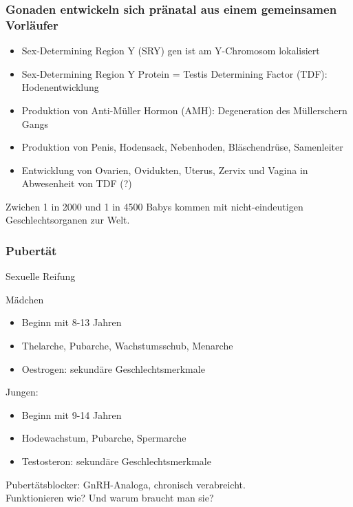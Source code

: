 \documentclass{beamer}
\begin{document}
\begin{frame}
\frametitle{Gonaden entwickeln sich pränatal aus einem gemeinsamen Vorläufer}


\begin{itemize}
    \item 
 Sex-Determining Region Y (SRY) gen ist am Y-Chromosom lokalisiert
   \pause
 \item
 Sex-Determining Region Y Protein = Testis Determining Factor (TDF): Hodenentwicklung
 \pause
 \item
Produktion von Anti-Müller Hormon (AMH): Degeneration des Müllerschern Gangs
\pause
 \item
Produktion  von Penis, Hodensack, Nebenhoden, Bläschendrüse, Samenleiter
\pause
 \item
Entwicklung von Ovarien, Ovidukten, Uterus, Zervix und Vagina in Abwesenheit von TDF (?)

\end{itemize}

\pause
Zwichen 1 in 2000 und 1 in 4500 Babys kommen mit nicht-eindeutigen Geschlechtsorganen zur Welt. 

\end{frame}




\begin{frame}

\frametitle{Pubertät}
Sexuelle Reifung

\begin{block}{Mädchen}
\begin{itemize}
\item
Beginn mit 8-13 Jahren
\item
Thelarche, Pubarche, Wachstumsschub, Menarche
\item
Oestrogen: sekundäre Geschlechtsmerkmale
\end{itemize}
\end{block} 

\pause

\begin{block}{Jungen:}
\begin{itemize}
\item
Beginn mit 9-14 Jahren
\item    
Hodewachstum, Pubarche, Spermarche
\item
Testosteron: sekundäre Geschlechtsmerkmale
\end{itemize}
\end{block}

\pause

Pubertätsblocker: GnRH-Analoga, chronisch verabreicht. \\
\textcolor{theme}{Funktionieren wie? Und warum braucht man sie?}

\end{frame}
\end{document}
